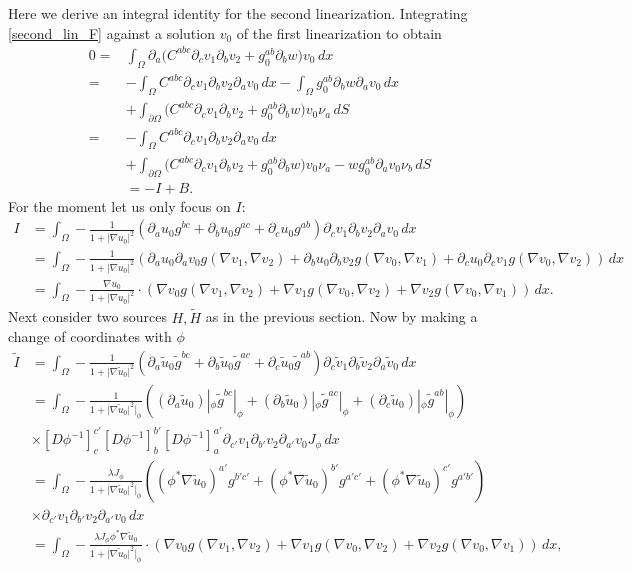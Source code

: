 \documentclass[a4paper, 10pt, twoside, notitlepage]{amsart}
\theoremstyle{plain}
\newcommand{\Om}{\Omega}
\numberwithin{equation}{section}
\newcommand {\p} {\partial}
\newcommand{\abs}[1]{\lvert #1 \rvert}
\begin{document}
Here we derive an integral identity for the second linearization. Integrating \eqref{second_lin_F} against a solution $v_0$ of the first linearization to obtain
\begin{align*}
	0=&\int_{\Om}\p_a\big(C^{abc}\p_cv_1\p_bv_2 + g_0^{ab}\p_bw\big) v_0\,dx\\
	=& -\int_{\Om} C^{abc}\p_cv_1\p_bv_2\p_av_0\,dx - \int_{\Om}g_0^{ab}\p_bw\p_av_0\,dx \\
	&+ \int_{\p\Om} \big(C^{abc}\p_cv_1\p_bv_2 + g_0^{ab}\p_bw\big) v_0\nu_a\,dS\\
	=& -\int_{\Om} C^{abc}\p_cv_1\p_bv_2\p_a v_0\,dx\\
	&+ \int_{\p\Om} \big(C^{abc}\p_cv_1\p_bv_2 + g_0^{ab}\p_bw\big) v_0\nu_a - wg_0^{ab}\p_a v_0\nu_b\,dS\\
	&= -I + B.
\end{align*}
For the moment let us only focus on $I$:
\begin{align*}
	I&=\int_{\Om} -\frac{1}{1+\abs{\nabla u_0}^2}(\p_au_0g^{bc} + \p_bu_0 g^{ac} + \p_cu_0 g^{ab}) \p_cv_1\p_bv_2\p_a v_0\,dx\\
	&= \int_{\Om} -\frac{1}{1+\abs{\nabla u_0}^2}(\p_au_0\p_a v_0g(\nabla v_1,\nabla v_2) + \p_bu_0\p_bv_2g(\nabla v_0,\nabla v_1) + \p_cu_0\p_c v_1g(\nabla v_0,\nabla v_2))\,dx\\
	&= \int_{\Om} -\frac{\nabla u_0}{1+\abs{\nabla u_0}^2}\cdot(\nabla v_0g(\nabla v_1,\nabla v_2) + \nabla v_1g(\nabla v_0,\nabla v_2) + \nabla v_2g(\nabla v_0,\nabla v_1))\, dx.
\end{align*}
Next consider two sources $H, \tilde H$ as in the previous section. Now by making a change of coordinates with $\phi$
\begin{align*}
	\tilde I &= \int_{\Om} -\frac{1}{1+\abs{\nabla\tilde u_0}^2}(\p_a\tilde u_0\tilde g^{bc} + \p_b\tilde u_0 \tilde g^{ac} + \p_c\tilde u_0 \tilde g^{ab}) \p_c\tilde v_1\p_b\tilde v_2\p_a \tilde v_0\,dx\\
	&= \int_{\Om} -\frac{1}{1+\abs{\nabla \tilde u_0}^2|_{\phi}}((\p_a\tilde u_0)|_{\phi}\tilde g^{bc}|_{\phi} + (\p_b\tilde u_0)|_{\phi} \tilde g^{ac}|_{\phi} + (\p_c\tilde u_0)|_{\phi} \tilde g^{ab}|_{\phi})\\
	&\times [D\phi^{-1}]^{c'}_{c}[D\phi^{-1}]^{b'}_{b}[D\phi^{-1}]^{a'}_{a}\p_{c'}v_1\p_{b'}v_2\p_{a'}v_0J_{\phi}\,dx\\
	&= \int_{\Om} -\frac{\lambda J_{\phi}}{1+\abs{\nabla \tilde u_0}^2|_{\phi}} ((\phi^*\nabla\tilde u_0)^{a'} g^{b'c'} + (\phi^*\nabla\tilde u_0)^{b'} g^{a'c'} + (\phi^*\nabla\tilde u_0)^{c'} g^{a'b'})\\
	&\times \p_{c'}v_1\p_{b'}v_2\p_{a'}v_0\,dx\\
	&= \int_{\Om} -\frac{\lambda J_{\phi} \phi^*\nabla \tilde u_0}{1+\abs{\nabla \tilde u_0}^2|_{\phi}}\cdot(\nabla v_0g(\nabla v_1,\nabla v_2) + \nabla v_1g(\nabla v_0,\nabla v_2) + \nabla v_2g(\nabla v_0,\nabla v_1))\, dx,
\end{align*}
\end{document}
